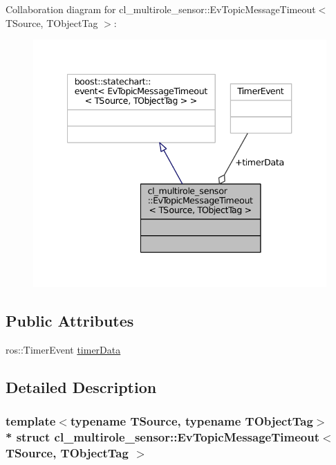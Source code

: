 Collaboration diagram for cl\+\_\+multirole\+\_\+sensor\+:\+:Ev\+Topic\+Message\+Timeout$<$ T\+Source, T\+Object\+Tag $>$\+:
\nopagebreak
\begin{figure}[H]
\begin{center}
\leavevmode
\includegraphics[width=340pt]{structcl__multirole__sensor_1_1EvTopicMessageTimeout__coll__graph}
\end{center}
\end{figure}
\subsection*{Public Attributes}
\begin{DoxyCompactItemize}
\item 
ros\+::\+Timer\+Event \hyperlink{structcl__multirole__sensor_1_1EvTopicMessageTimeout_af4d418aeb793c180ee0becc2dec0dc34}{timer\+Data}
\end{DoxyCompactItemize}


\subsection{Detailed Description}
\subsubsection*{template$<$typename T\+Source, typename T\+Object\+Tag$>$\\*
struct cl\+\_\+multirole\+\_\+sensor\+::\+Ev\+Topic\+Message\+Timeout$<$ T\+Source, T\+Object\+Tag $>$}



